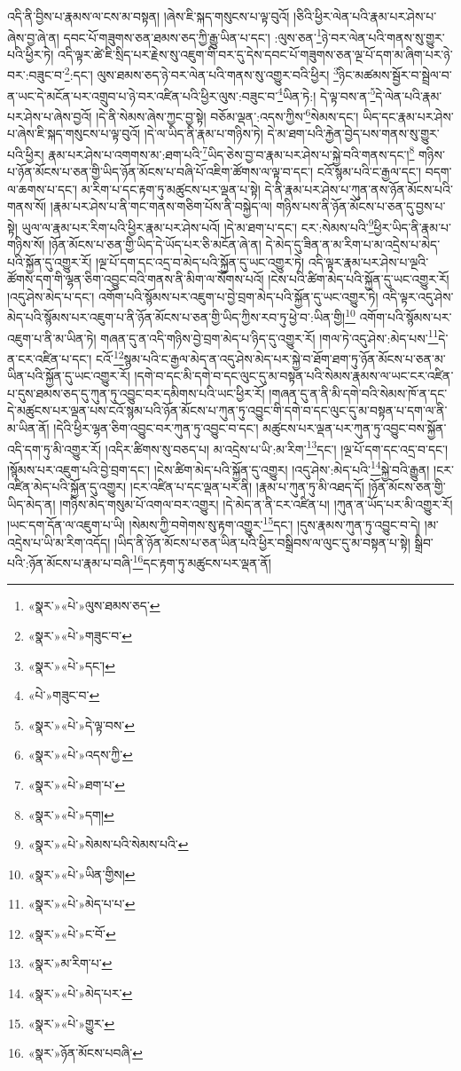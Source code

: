 འདི་ནི་བྱིས་པ་རྣམས་ལ་ངས་མ་བསྟན། །ཞེས་ཇི་སྐད་གསུངས་པ་ལྟ་བུའོ། །ཅིའི་ཕྱིར་ལེན་པའི་རྣམ་པར་ཤེས་པ་ཞེས་བྱ་ཞེ་ན། དབང་པོ་གཟུགས་ཅན་ཐམས་ཅད་ཀྱི་རྒྱུ་ཡིན་པ་དང་། :ལུས་ཅན་\footnote{«སྣར་»«པེ་»ལུས་ཐམས་ཅད་}ཉེ་བར་ལེན་པའི་གནས་སུ་གྱུར་པའི་ཕྱིར་ཏེ། འདི་ལྟར་ཚེ་ཇི་སྲིད་པར་རྗེས་སུ་འཇུག་གི་བར་དུ་དེས་དབང་པོ་གཟུགས་ཅན་ལྔ་པོ་དག་མ་ཞིག་པར་ཉེ་བར་:བཟུང་བ་\footnote{«སྣར་»«པེ་»གཟུང་བ་}:དང་། ལུས་ཐམས་ཅད་ཉེ་བར་ལེན་པའི་གནས་སུ་འགྱུར་བའི་ཕྱིར། \footnote{«སྣར་»«པེ་»དང་།  }ཉིང་མཚམས་སྦྱོར་བ་སྦྲེལ་བ་ན་ཡང་དེ་མངོན་པར་འགྲུབ་པ་ཉེ་བར་འཛིན་པའི་ཕྱིར་ལུས་:བཟུང་བ་\footnote{«པེ་»གཟུང་བ་}ཡིན་ཏེ:། དེ་ལྟ་བས་ན་\footnote{«སྣར་»«པེ་»དེ་ལྟ་བས་}དེ་ལེན་པའི་རྣམ་པར་ཤེས་པ་ཞེས་བྱའོ། །དེ་ནི་སེམས་ཞེས་ཀྱང་བྱ་སྟེ། བཅོམ་ལྡན་:འདས་ཀྱིས་\footnote{«སྣར་»«པེ་»འདས་ཀྱི་}སེམས་དང་། ཡིད་དང་རྣམ་པར་ཤེས་པ་ཞེས་ཇི་སྐད་གསུངས་པ་ལྟ་བུའོ། །དེ་ལ་ཡིད་ནི་རྣམ་པ་གཉིས་ཏེ། དེ་མ་ཐག་པའི་རྐྱེན་བྱེད་པས་གནས་སུ་གྱུར་པའི་ཕྱིར། རྣམ་པར་ཤེས་པ་འགགས་མ་:ཐག་པའི་\footnote{«སྣར་»«པེ་»ཐག་པ་}ཡིད་ཅེས་བྱ་བ་རྣམ་པར་ཤེས་པ་སྐྱེ་བའི་གནས་དང་།\footnote{«སྣར་»«པེ་»དག།} གཉིས་པ་ཉོན་མོངས་པ་ཅན་གྱི་ཡིད་ཉོན་མོངས་པ་བཞི་པོ་འཇིག་ཚོགས་ལ་ལྟ་བ་དང་། ངའོ་སྙམ་པའི་ང་རྒྱལ་དང་། བདག་ལ་ཆགས་པ་དང་། མ་རིག་པ་དང་རྟག་ཏུ་མཚུངས་པར་ལྡན་པ་སྟེ། དེ་ནི་རྣམ་པར་ཤེས་པ་ཀུན་ནས་ཉོན་མོངས་པའི་གནས་སོ། །རྣམ་པར་ཤེས་པ་ནི་གང་གནས་གཅིག་པོས་ནི་བསྐྱེད་ལ། གཉིས་པས་ནི་ཉོན་མོངས་པ་ཅན་དུ་བྱས་པ་སྟེ། ཡུལ་ལ་རྣམ་པར་རིག་པའི་ཕྱིར་རྣམ་པར་ཤེས་པའོ། །དེ་མ་ཐག་པ་དང་། ངར་:སེམས་པའི་\footnote{«སྣར་»«པེ་»སེམས་པའི་སེམས་པའི་}ཕྱིར་ཡིད་ནི་རྣམ་པ་གཉིས་སོ། །ཉོན་མོངས་པ་ཅན་གྱི་ཡིད་དེ་ཡོད་པར་ཅི་མངོན་ཞེ་ན། དེ་མེད་དུ་ཟིན་ན་མ་རིག་པ་མ་འདྲེས་པ་མེད་པའི་སྐྱོན་དུ་འགྱུར་རོ། །ལྔ་པོ་དག་དང་འདྲ་བ་མེད་པའི་སྐྱོན་དུ་ཡང་འགྱུར་ཏེ། འདི་ལྟར་རྣམ་པར་ཤེས་པ་ལྔའི་ཚོགས་དག་གི་ལྷན་ཅིག་འབྱུང་བའི་གནས་ནི་མིག་ལ་སོགས་པའོ། །ངེས་པའི་ཚིག་མེད་པའི་སྐྱོན་དུ་ཡང་འགྱུར་རོ། །འདུ་ཤེས་མེད་པ་དང་། འགོག་པའི་སྙོམས་པར་འཇུག་པ་བྱེ་བྲག་མེད་པའི་སྐྱོན་དུ་ཡང་འགྱུར་ཏེ། འདི་ལྟར་འདུ་ཤེས་མེད་པའི་སྙོམས་པར་འཇུག་པ་ནི་ཉོན་མོངས་པ་ཅན་གྱི་ཡིད་ཀྱིས་རབ་ཏུ་ཕྱེ་བ་:ཡིན་གྱི།\footnote{«སྣར་»«པེ་»ཡིན་གྱིས།} འགོག་པའི་སྙོམས་པར་འཇུག་པ་ནི་མ་ཡིན་ཏེ། གཞན་དུ་ན་འདི་གཉིས་བྱེ་བྲག་མེད་པ་ཉིད་དུ་འགྱུར་རོ། །གལ་ཏེ་འདུ་ཤེས་:མེད་པས་\footnote{«སྣར་»«པེ་»མེད་པ་པ་}དེ་ན་ངར་འཛིན་པ་དང་། ངའོ་\footnote{«སྣར་»«པེ་»ང་བོ་}སྙམ་པའི་ང་རྒྱལ་མེད་ན་འདུ་ཤེས་མེད་པར་སྐྱེ་བ་ཐོག་ཐག་ཏུ་ཉོན་མོངས་པ་ཅན་མ་ཡིན་པའི་སྐྱོན་དུ་ཡང་འགྱུར་རོ། །དགེ་བ་དང་མི་དགེ་བ་དང་ལུང་དུ་མ་བསྟན་པའི་སེམས་རྣམས་ལ་ཡང་ངར་འཛིན་པ་དུས་ཐམས་ཅད་དུ་ཀུན་ཏུ་འབྱུང་བར་དམིགས་པའི་ཡང་ཕྱིར་རོ། །གཞན་དུ་ན་ནི་མི་དགེ་བའི་སེམས་ཁོ་ན་དང་དེ་མཚུངས་པར་ལྡན་པས་ངའོ་སྙམ་པའི་ཉོན་མོངས་པ་ཀུན་ཏུ་འབྱུང་གི་དགེ་བ་དང་ལུང་དུ་མ་བསྟན་པ་དག་ལ་ནི་མ་ཡིན་ནོ། །དེའི་ཕྱིར་ལྷན་ཅིག་འབྱུང་བར་ཀུན་ཏུ་འབྱུང་བ་དང་། མཚུངས་པར་ལྡན་པར་ཀུན་ཏུ་འབྱུང་བས་སྐྱོན་འདི་དག་ཏུ་མི་འགྱུར་རོ། །འདིར་ཚིགས་སུ་བཅད་པ། མ་འདྲེས་པ་ཡི་:མ་རིག་\footnote{«སྣར་»མ་རིག་པ་}དང་། །ལྔ་པོ་དག་དང་འདྲ་བ་དང་། །སྙོམས་པར་འཇུག་པའི་བྱེ་བྲག་དང་། །ངེས་ཚིག་མེད་པའི་སྐྱོན་དུ་འགྱུར། །འདུ་ཤེས་:མེད་པའི་\footnote{«སྣར་»«པེ་»མེད་པར་}སྐྱེ་བའི་རྒྱུན། །ངར་འཛིན་མེད་པའི་སྐྱོན་དུ་འགྱུར། །ངར་འཛིན་པ་དང་ལྡན་པར་ནི། །རྣམ་པ་ཀུན་ཏུ་མི་འཐད་དོ། །ཉོན་མོངས་ཅན་གྱི་ཡིད་མེད་ན། །གཉིས་མེད་གསུམ་པོ་འགལ་བར་འགྱུར། །དེ་མེད་ན་ནི་ངར་འཛིན་པ། །ཀུན་ན་ཡོད་པར་མི་འགྱུར་རོ། །ཡང་དག་དོན་ལ་འཇུག་པ་ཡི། །སེམས་ཀྱི་བགེགས་སུ་རྟག་འགྱུར་\footnote{«སྣར་»«པེ་»གྱུར་}དང་། །དུས་རྣམས་ཀུན་ཏུ་འབྱུང་བ་དེ། །མ་འདྲེས་པ་ཡི་མ་རིག་འདོད། །ཡིད་ནི་ཉོན་མོངས་པ་ཅན་ཡིན་པའི་ཕྱིར་བསྒྲིབས་ལ་ལུང་དུ་མ་བསྟན་པ་སྟེ། སྒྲིབ་པའི་:ཉོན་མོངས་པ་རྣམ་པ་བཞི་\footnote{«སྣར་»ཉོན་མོངས་པབཞི་}དང་རྟག་ཏུ་མཚུངས་པར་ལྡན་ནོ། 
